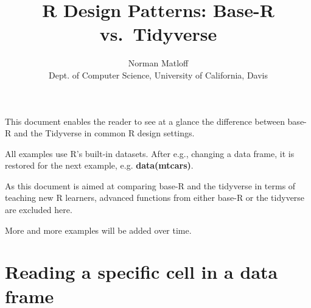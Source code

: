 \documentclass[11pt]{article}
\title{R Design Patterns: Base-R vs.\ Tidyverse}
\author{Norman Matloff \\
      Dept. of Computer Science, University of California, Davis}
\begin{document}
\maketitle

This document enables the reader to see at a glance the difference
between base-R and the Tidyverse in common R design settings.

All examples use R's built-in datasets.  After e.g., changing a data
frame, it is restored for the next example, e.g. \textbf{data(mtcars)}.

As this document is aimed at comparing base-R and the tidyverse in terms
of teaching new R learners, advanced functions from either base-R or the
tidyverse are excluded here.

More and more examples will be added over time.

\section*{Reading a specific cell in a data frame}



\begin{parcolumns}[rulebetween=true]{2}


\hspace{0.1in}


\end{parcolumns}
\end{document}
